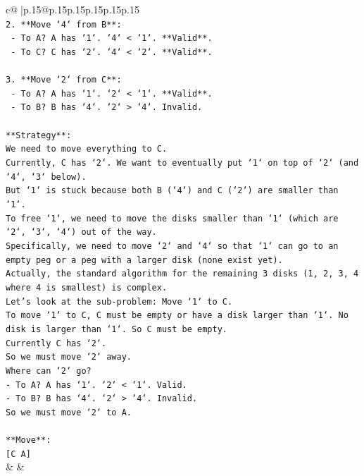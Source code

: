 \documentclass{article}
\begin{document}
{\begin{supertabular}{c@{$\;$}|p{.15\linewidth}@{}p{.15\linewidth}p{.15\linewidth}p{.15\linewidth}p{.15\linewidth}p{.15\linewidth}}
{{{\\ 
\texttt{2. **Move `4` from B**:} \\
\texttt{   {-} To A? A has `1`. `4` < `1`. **Valid**.} \\
\texttt{   {-} To C? C has `2`. `4` < `2`. **Valid**.} \\
\\ 
\texttt{3. **Move `2` from C**:} \\
\texttt{   {-} To A? A has `1`. `2` < `1`. **Valid**.} \\
\texttt{   {-} To B? B has `4`. `2` > `4`. Invalid.} \\
\\ 
\texttt{**Strategy**:} \\
\texttt{We need to move everything to C.} \\
\texttt{Currently, C has `2`. We want to eventually put `1` on top of `2` (and `4`, `3` below).} \\
\texttt{But `1` is stuck because both B (`4`) and C (`2`) are smaller than `1`.} \\
\texttt{To free `1`, we need to move the disks smaller than `1` (which are `2`, `3`, `4`) out of the way.} \\
\texttt{Specifically, we need to move `2` and `4` so that `1` can go to an empty peg or a peg with a larger disk (none exist yet).} \\
\texttt{Actually, the standard algorithm for the remaining 3 disks (1, 2, 3, 4 where 4 is smallest) is complex.} \\
\texttt{Let's look at the sub{-}problem: Move `1` to C.} \\
\texttt{To move `1` to C, C must be empty or have a disk larger than `1`. No disk is larger than `1`. So C must be empty.} \\
\texttt{Currently C has `2`.} \\
\texttt{So we must move `2` away.} \\
\texttt{Where can `2` go?} \\
\texttt{{-} To A? A has `1`. `2` < `1`. Valid.} \\
\texttt{{-} To B? B has `4`. `2` > `4`. Invalid.} \\
\texttt{So we must move `2` to A.} \\
\\ 
\texttt{**Move**:} \\
\texttt{{[}C A{]}} \\
            }
        }
    }
    & & \\ \\


\end{supertabular}}
\end{document}
